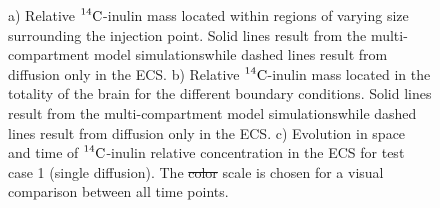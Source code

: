 \documentclass[a4paper,11pt]{article} %
\newcommand{\1}{^{(1)}}
\newcommand{\2}{^{(2)}}
\newcommand{\Cinulin}{$\prescript{14}{}{\text{C}}$-inulin }
\providecommand{\DIFaddtex}[1]{{\protect\color{blue}\uwave{#1}}} %
\providecommand{\DIFdeltex}[1]{{\protect\color{red}\sout{#1}}}                      %
\providecommand{\DIFdelend}{} %
\providecommand{\DIFaddFL}[1]{\DIFadd{#1}} %
\providecommand{\DIFdelFL}[1]{\DIFdel{#1}} %
\providecommand{\DIFaddbeginFL}{} %
\providecommand{\DIFaddendFL}{} %
\providecommand{\DIFdelbeginFL}{} %
\providecommand{\DIFdelendFL}{} %
\providecommand{\DIFadd}[1]{\texorpdfstring{\DIFaddtex{#1}}{#1}} %
\providecommand{\DIFdel}[1]{\texorpdfstring{\DIFdeltex{#1}}{}} %
\newcommand{\DIFscaledelfig}{0.5}
\newlength{\DIFdelgraphicswidth} %
\newlength{\DIFdelgraphicsheight} %
\newcommand{\DIFaddincludegraphics}[2][]{{\color{blue}\fbox{\DIFOincludegraphics[#1]{#2}}}} %
\newcommand{\DIFdelincludegraphics}[2][]{%
\sbox{\DIFdelgraphicsbox}{\DIFOincludegraphics[#1]{#2}}%
\settoboxwidth{\DIFdelgraphicswidth}{\DIFdelgraphicsbox} %
\settoboxtotalheight{\DIFdelgraphicsheight}{\DIFdelgraphicsbox} %
\scalebox{\DIFscaledelfig}{%
\parbox[b]{\DIFdelgraphicswidth}{\usebox{\DIFdelgraphicsbox}\\[-\baselineskip] \rule{\DIFdelgraphicswidth}{0em}}\llap{\resizebox{\DIFdelgraphicswidth}{\DIFdelgraphicsheight}{%
\setlength{\unitlength}{\DIFdelgraphicswidth}%
\begin{picture}(1,1)%
\thicklines\linethickness{2pt} %
{\color[rgb]{1,0,0}\put(0,0){\framebox(1,1){}}}%
{\color[rgb]{1,0,0}\put(0,0){\line( 1,1){1}}}%
{\color[rgb]{1,0,0}\put(0,1){\line(1,-1){1}}}%
\end{picture}%
}\hspace*{3pt}}} %
} %
\DeclareRobustCommand{\DIFdelend}{\DIFOaddend \let\includegraphics\DIFOincludegraphics} %
\DeclareRobustCommand{\DIFaddbeginFL}{\DIFOaddbeginFL \let\includegraphics\DIFaddincludegraphics} %
\DeclareRobustCommand{\DIFaddendFL}{\DIFOaddendFL \let\includegraphics\DIFOincludegraphics} %
\DeclareRobustCommand{\DIFdelbeginFL}{\DIFOdelbeginFL \let\includegraphics\DIFdelincludegraphics} %
\DeclareRobustCommand{\DIFdelendFL}{\DIFOaddendFL \let\includegraphics\DIFOincludegraphics} %
\begin{document}
\DIFdelend \begin{figure}
    \centering
    \caption{a) Relative \Cinulin mass located within regions of varying size surrounding the injection point. Solid lines result from the multi-compartment model simulations\DIFaddbeginFL \DIFaddFL{, }\DIFaddendFL while dashed lines result from diffusion only in the ECS. b) Relative \Cinulin mass located in the totality of the brain for the different boundary conditions. Solid lines result from the multi-compartment model simulations\DIFaddbeginFL \DIFaddFL{, }\DIFaddendFL while dashed lines result from diffusion only in the ECS. c) Evolution in space and time of \Cinulin relative concentration in the ECS for test case 1 (single diffusion). The \DIFdelbeginFL \DIFdelFL{color }\DIFdelendFL \DIFaddbeginFL \DIFaddFL{colour }\DIFaddendFL scale is chosen for a visual comparison between all time points.}
    \label{fig:samples-Inulin}
\end{figure}

\end{document}
